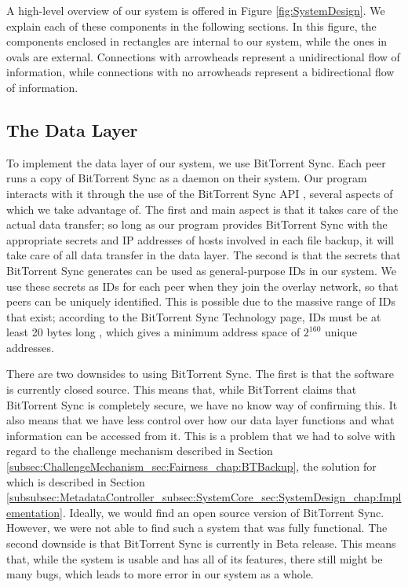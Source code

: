 \documentclass[12pt]{report}
\begin{document}
A high-level overview of our system is offered in Figure \ref{fig:SystemDesign}. We explain each of these components in the following sections. In this figure, the components enclosed in rectangles are internal to our system, while the ones in ovals are external. Connections with arrowheads represent a unidirectional flow of information, while connections with no arrowheads represent a bidirectional flow of information.

\subsection{The Data Layer}
To implement the data layer of our system, we use BitTorrent Sync. Each peer runs a copy of BitTorrent Sync as a daemon on their system. Our program interacts with it through the use of the BitTorrent Sync API \cite{btsyncapi}, several aspects of which we take advantage of. The first and main aspect is that it takes care of the actual data transfer; so long as our program provides BitTorrent Sync with the appropriate secrets and IP addresses of hosts involved in each file backup, it will take care of all data transfer in the data layer. The second is that the secrets that BitTorrent Sync generates can be used as general-purpose IDs in our system. We use these secrets as IDs for each peer when they join the overlay network, so that peers can be uniquely identified. This is possible due to the massive range of IDs that exist; according to the BitTorrent Sync Technology page, IDs must be at least 20 bytes long \cite{btsynctech}, which gives a minimum address space of $2^{160}$ unique addresses.

There are two downsides to using BitTorrent Sync. The first is that the software is currently closed source. This means that, while BitTorrent claims that BitTorrent Sync is completely secure, we have no know way of confirming this. It also means that we have less control over how our data layer functions and what information can be accessed from it. This is a problem that we had to solve with regard to the challenge mechanism described in Section \ref{subsec:ChallengeMechanism_sec:Fairness_chap:BTBackup}, the solution for which is described in Section \ref{subsubsec:MetadataController_subsec:SystemCore_sec:SystemDesign_chap:Implementation}. Ideally, we would find an open source version of BitTorrent Sync. However, we were not able to find such a system that was fully functional. The second downside is that BitTorrent Sync is currently in Beta release. This means that, while the system is usable and has all of its features, there still might be many bugs, which leads to more error in our system as a whole.
\end{document}
